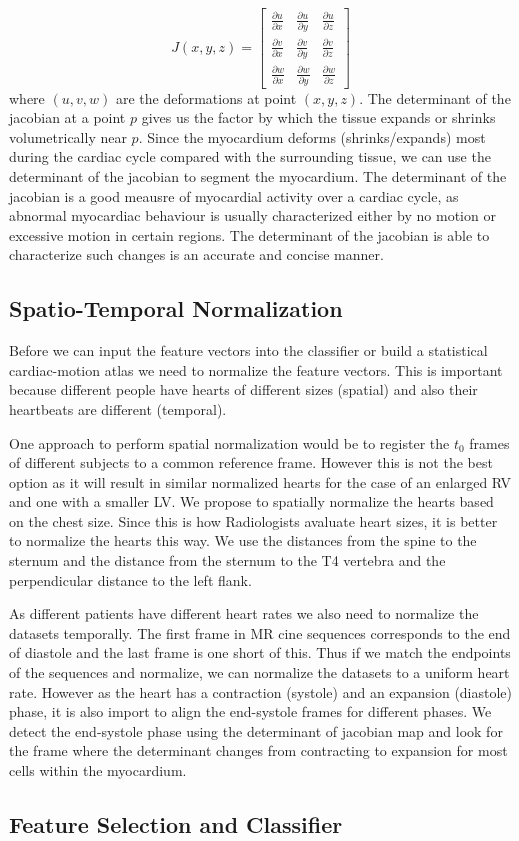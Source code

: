 \begin{equation}
J(x,y,z) = \left[  
	\begin{array}{ccc}
		\frac{\partial u}{\partial x} & \frac{\partial u}{\partial y} & \frac{\partial u}{\partial z} \\	
		\frac{\partial v}{\partial x} & \frac{\partial v}{\partial y} & \frac{\partial v}{\partial z} \\	
		\frac{\partial w}{\partial x} & \frac{\partial w}{\partial y} & \frac{\partial w}{\partial z} 
	\end{array}
	\right] 
\end{equation} 
where $(u,v,w)$ are the deformations at point $(x,y,z)$. The determinant of the jacobian at a point $p$ gives us the factor by which the tissue expands or shrinks volumetrically near $p$. Since the myocardium deforms (shrinks/expands) most during the cardiac cycle compared with the surrounding tissue, we can use the determinant of the jacobian to segment the myocardium. The determinant of the jacobian is a good meausre of myocardial activity over a cardiac cycle, as abnormal myocardiac behaviour is usually characterized either by no motion or excessive motion in certain regions. The determinant of the jacobian is able to characterize such changes is an accurate and concise manner.

\subsection{Spatio-Temporal Normalization}

Before we can input the feature vectors into the classifier
or build a statistical cardiac-motion atlas we need to normalize the feature
vectors. This is important because different people have hearts of different
sizes (spatial) and also their heartbeats are different (temporal).

One approach to perform spatial normalization would be to register the $t_0$
frames of different subjects to a common reference frame. However this is not
the best option as it will result in similar normalized hearts for the case of
an enlarged RV and one with a smaller LV. We propose to spatially normalize
the hearts based on the chest size. Since this is how Radiologists avaluate
heart sizes, it is better to normalize the hearts this way. We use the
distances from the spine to the sternum and the distance from the sternum to
the T4 vertebra and the perpendicular distance to the left flank.

As different patients have different heart rates we also need to normalize the
datasets temporally. The first frame in MR cine sequences corresponds to the
end of diastole and the last frame is one short of this. Thus if we match the
endpoints of the sequences and normalize, we can normalize the datasets to a
uniform heart rate. However as the heart has a contraction (systole) and an
expansion (diastole) phase, it is also import to align the end-systole frames
for different phases. We detect the end-systole phase using the determinant of
jacobian map and look for the frame where the determinant changes from
contracting to expansion for most cells within the myocardium.

\subsection{Feature Selection and Classifier}
